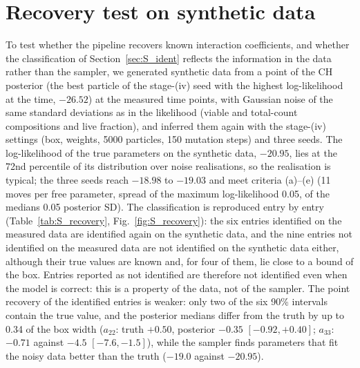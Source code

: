 \section{Recovery test on synthetic data}
\label{sec:S_recovery}
To test whether the pipeline recovers known interaction coefficients, and whether the classification of Section~\ref{sec:S_ident} reflects the information in the data rather than the sampler, we generated synthetic data from a point of the CH posterior (the best particle of the stage-(iv) seed with the highest log-likelihood at the time, $-26.52$) at the measured time points, with Gaussian noise of the same standard deviations as in the likelihood (viable and total-count compositions and live fraction), and inferred them again with the stage-(iv) settings (box, weights, 5000 particles, 150 mutation steps) and three seeds.
The log-likelihood of the true parameters on the synthetic data, $-20.95$, lies at the 72nd percentile of its distribution over noise realisations, so the realisation is typical; the three seeds reach $-18.98$ to $-19.03$ and meet criteria (a)--(e) (11 moves per free parameter, spread of the maximum log-likelihood 0.05, of the medians 0.05 posterior SD).
The classification is reproduced entry by entry (Table~\ref{tab:S_recovery}, Fig.~\ref{fig:S_recovery}): the six entries identified on the measured data are identified again on the synthetic data, and the nine entries not identified on the measured data are not identified on the synthetic data either, although their true values are known and, for four of them, lie close to a bound of the box.
Entries reported as not identified are therefore not identified even when the model is correct: this is a property of the data, not of the sampler.
The point recovery of the identified entries is weaker: only two of the six 90\% intervals contain the true value, and the posterior medians differ from the truth by up to 0.34 of the box width ($a_{22}$: truth $+0.50$, posterior $-0.35$ $[-0.92,+0.40]$; $a_{33}$: $-0.71$ against $-4.5$ $[-7.6,-1.5]$), while the sampler finds parameters that fit the noisy data better than the truth ($-19.0$ against $-20.95$).
